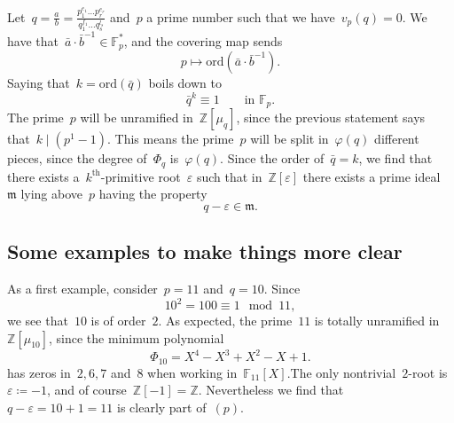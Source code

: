 Let~${q = \frac{a}{b} = \frac{p_1^{e_1}\ldots p_r^{e_r}}{q_1^{f_1}\ldots q_s^{l_s}}}$ and~${p}$ a prime number such that we have~${v_p(q) = 0}$. We have that~${\bar{a} \cdot \bar{b}^{-1} \in \mathbb{F}_p^*}$, and the covering map sends 
\begin{equation}
  p \mapsto \mathrm{ord}(\bar{a} \cdot \bar{b}^{-1}).
\end{equation}
Saying that~${k = \mathrm{ord}(\bar{q})}$ boils down to 
\begin{equation}
  \bar{q}^k \equiv 1 \qquad \text{in } \mathbb{F}_p.
\end{equation}
The prime~${p}$ will be unramified in~${\mathbb{Z}[\mu_q]}$, since the previous statement says that~${k \mid (p^{1} - 1)}$. This means the prime~${p}$ will be split in~${\varphi(q)}$ different pieces, since the degree of~${\Phi_q}$ is~${\varphi(q)}$. Since the order of~${\bar{q} = k}$, we find that there exists a~${k^{\text{th}}}$-primitive root~${\varepsilon}$ such that in~${\mathbb{Z}[\varepsilon]}$ there exists a prime ideal~${\mathfrak{m}}$ lying above~${p}$ having the property 
\begin{equation}
  q - \varepsilon \in \mathfrak{m}.
\end{equation}

\subsection{Some examples to make things more clear}
\begin{example}
	As a first example, consider~${p = 11}$ and~${q = 10}$. Since
  \begin{equation}
    {10^2 = 100 \equiv 1 \mod 11},
  \end{equation}
  we see that~${10}$ is of order~$2$. As expected, the prime~${11}$ is totally unramified in~${\mathbb{Z}[\mu_{10}]}$, since the minimum polynomial 
  \begin{equation}
    \Phi_{10} = X^4 - X^3 + X^2 - X + 1.
  \end{equation}
  has zeros in~${2,6,7}$ and~${8}$ when working in~${\mathbb{F}_{11}[X]}$.The only nontrivial~${2}$-root is~${\varepsilon\coloneqq-1}$, and of course~${\mathbb{Z}[-1] = \mathbb{Z}}$. Nevertheless we find that~${q - \varepsilon = 10 + 1 = 11}$ is clearly part of~${(p)}$.
\end{example}

